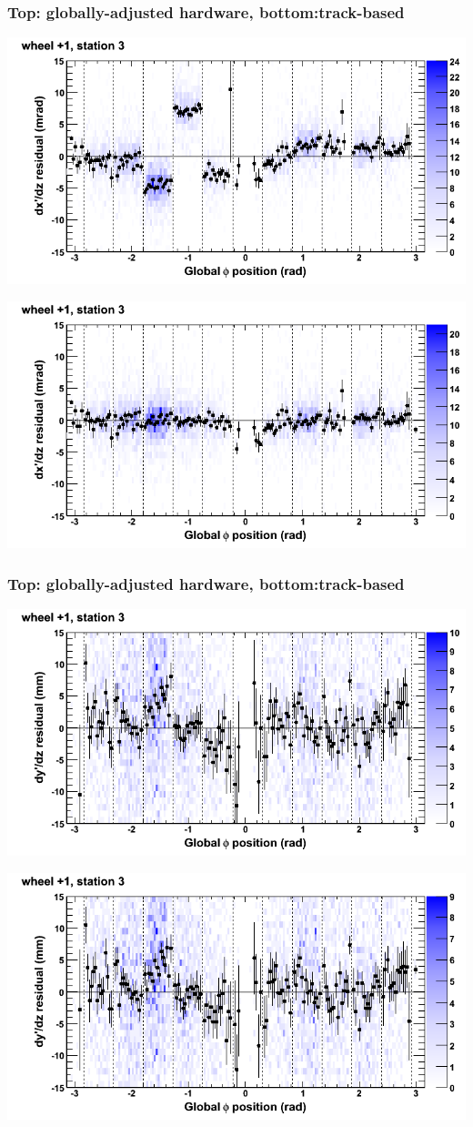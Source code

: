 \documentclass[compress]{beamer}
\begin{document}
\begin{frame}
\frametitle{Top: globally-adjusted hardware, bottom:track-based}
\includegraphics[width=0.7\linewidth]{NOV4_mapplots_HW/DTvsphi_st3whD_dxdz.png}

\includegraphics[width=0.7\linewidth]{NOV4_mapplots/DTvsphi_st3whD_dxdz.png}
\end{frame}

\begin{frame}
\frametitle{Top: globally-adjusted hardware, bottom:track-based}
\includegraphics[width=0.7\linewidth]{NOV4_mapplots_HW/DTvsphi_st3whD_dydz.png}

\includegraphics[width=0.7\linewidth]{NOV4_mapplots/DTvsphi_st3whD_dydz.png}
\end{frame}
\end{document}
